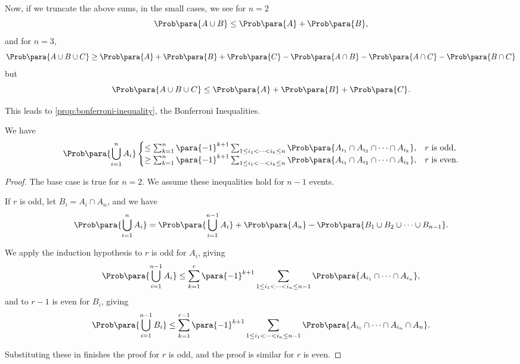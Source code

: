 Now, if we truncate the above sums, in the small cases, we see for \(n = 2\)
\[
    \Prob\para{A \cup B} \leq \Prob\para{A} + \Prob\para{B},
\]
and for \(n = 3\),
\[
    \Prob\para{A \cup B \cup C} \geq \Prob\para{A} + \Prob\para{B} + \Prob\para{C} - \Prob\para{A \cap B} - \Prob\para{A \cap C} - \Prob\para{B \cap C}
\]
but
\[
    \Prob\para{A \cup B \cup C} \leq \Prob\para{A} + \Prob\para{B} + \Prob\para{C}.
\]

This leads to \autoref{prop:bonferroni-inequality}, the Bonferroni Inequalities.

\begin{proposition}
    \label{prop:bonferroni-inequality}%
    We have
    \[
        \Prob\para{\bigcup_{i = 1}^{n} A_i} \begin{cases}
            \leq \sum_{k = 1}^{n} \para{-1}^{k + 1} \sum_{1 \leq i_1 < \cdots < i_k \leq n} \Prob\para{A_{i_1} \cap A_{i_2} \cap \cdots \cap A_{i_k}}, & r \text{ is odd}, \\
            \geq \sum_{k = 1}^{n} \para{-1}^{k + 1} \sum_{1 \leq i_1 < \cdots < i_k \leq n} \Prob\para{A_{i_1} \cap A_{i_2} \cap \cdots \cap A_{i_k}}, & r \text{ is even}.
        \end{cases}
    \]
\end{proposition}

\begin{proof}
    The base case is true for \(n = 2\). We assume these inequalities hold for \(n - 1\) events.

    If \(r\) is odd, let \(B_i = A_i \cap A_n\), and we have
    \[
        \Prob\para{\bigcup_{i = 1}^{n} A_i} = \Prob\para{\bigcup_{i = 1}^{n - 1} A_i} + \Prob\para{A_n} - \Prob\para{B_1 \cup B_2 \cup \cdots \cup B_{n - 1}}.
    \]

    We apply the induction hypothesis to \(r\) is odd for \(A_i\), giving
    \[
        \Prob\para{\bigcup_{i = 1}^{n - 1} A_i} \leq \sum_{k = 1}^{r} \para{-1}^{k + 1} \sum_{1 \leq i_1 < \cdots < i_n \leq n - 1} \Prob\para{A_{i_1} \cap \cdots \cap A_{i_n}},
    \]
    and to \(r - 1\) is even for \(B_i\), giving
    \[
        \Prob\para{\bigcup_{i = 1}^{n - 1} B_i} \leq \sum_{k = 1}^{r - 1} \para{-1}^{k + 1} \sum_{1 \leq i_1 < \cdots < i_n \leq n - 1} \Prob\para{A_{i_1} \cap \cdots \cap A_{i_n} \cap A_n}.
    \]

    Substituting these in finishes the proof for \(r\) is odd, and the proof is similar for \(r\) is even.
\end{proof}

